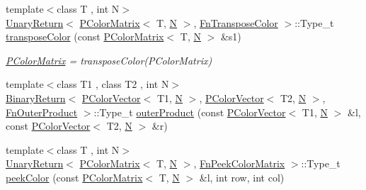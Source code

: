 \begin{DoxyCompactItemize}
\item 
{\footnotesize template$<$class T , int N$>$ }\\\mbox{\hyperlink{structENSEM_1_1UnaryReturn}{Unary\+Return}}$<$ \mbox{\hyperlink{classENSEM_1_1PColorMatrix}{P\+Color\+Matrix}}$<$ T, \mbox{\hyperlink{operator__name__util_8cc_a7722c8ecbb62d99aee7ce68b1752f337}{N}} $>$, \mbox{\hyperlink{structENSEM_1_1FnTransposeColor}{Fn\+Transpose\+Color}} $>$\+::Type\+\_\+t \mbox{\hyperlink{group__primcolormatrix_gad27a30bd1b98827095b42464443c9ffc}{transpose\+Color}} (const \mbox{\hyperlink{classENSEM_1_1PColorMatrix}{P\+Color\+Matrix}}$<$ T, \mbox{\hyperlink{operator__name__util_8cc_a7722c8ecbb62d99aee7ce68b1752f337}{N}} $>$ \&s1)
\begin{DoxyCompactList}\small\item\em \mbox{\hyperlink{classENSEM_1_1PColorMatrix}{P\+Color\+Matrix}} = transpose\+Color(\+P\+Color\+Matrix) \end{DoxyCompactList}\item 
{\footnotesize template$<$class T1 , class T2 , int N$>$ }\\\mbox{\hyperlink{structENSEM_1_1BinaryReturn}{Binary\+Return}}$<$ \mbox{\hyperlink{classENSEM_1_1PColorVector}{P\+Color\+Vector}}$<$ T1, \mbox{\hyperlink{operator__name__util_8cc_a7722c8ecbb62d99aee7ce68b1752f337}{N}} $>$, \mbox{\hyperlink{classENSEM_1_1PColorVector}{P\+Color\+Vector}}$<$ T2, \mbox{\hyperlink{operator__name__util_8cc_a7722c8ecbb62d99aee7ce68b1752f337}{N}} $>$, \mbox{\hyperlink{structENSEM_1_1FnOuterProduct}{Fn\+Outer\+Product}} $>$\+::Type\+\_\+t \mbox{\hyperlink{group__primcolormatrix_ga4f0b21163125568ab5bcbbef75a17973}{outer\+Product}} (const \mbox{\hyperlink{classENSEM_1_1PColorVector}{P\+Color\+Vector}}$<$ T1, \mbox{\hyperlink{operator__name__util_8cc_a7722c8ecbb62d99aee7ce68b1752f337}{N}} $>$ \&l, const \mbox{\hyperlink{classENSEM_1_1PColorVector}{P\+Color\+Vector}}$<$ T2, \mbox{\hyperlink{operator__name__util_8cc_a7722c8ecbb62d99aee7ce68b1752f337}{N}} $>$ \&r)
\item 
{\footnotesize template$<$class T , int N$>$ }\\\mbox{\hyperlink{structENSEM_1_1UnaryReturn}{Unary\+Return}}$<$ \mbox{\hyperlink{classENSEM_1_1PColorMatrix}{P\+Color\+Matrix}}$<$ T, \mbox{\hyperlink{operator__name__util_8cc_a7722c8ecbb62d99aee7ce68b1752f337}{N}} $>$, \mbox{\hyperlink{structENSEM_1_1FnPeekColorMatrix}{Fn\+Peek\+Color\+Matrix}} $>$\+::Type\+\_\+t \mbox{\hyperlink{group__primcolormatrix_ga44a6b0393ecffb0c4aecc93b45a8d12d}{peek\+Color}} (const \mbox{\hyperlink{classENSEM_1_1PColorMatrix}{P\+Color\+Matrix}}$<$ T, \mbox{\hyperlink{operator__name__util_8cc_a7722c8ecbb62d99aee7ce68b1752f337}{N}} $>$ \&l, int row, int col)

\end{DoxyCompactItemize}
